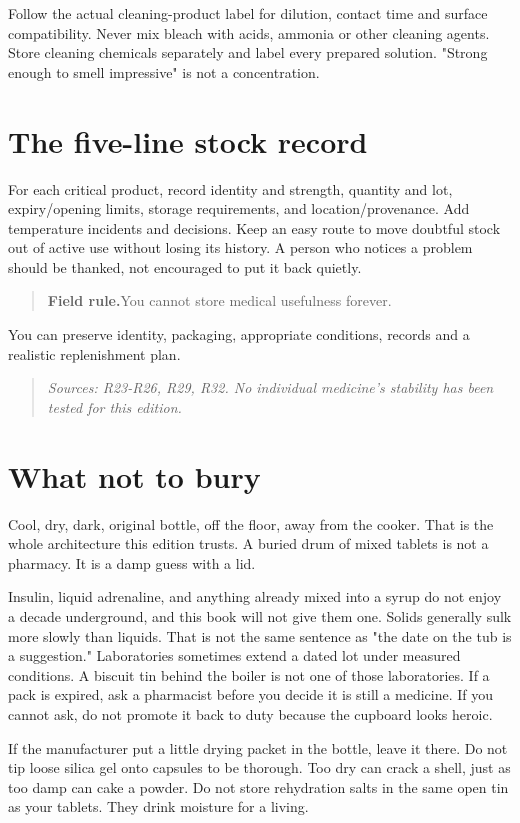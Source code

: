 \documentclass[10pt,openright]{book}
\newcommand{\fieldrule}[1]{\begin{quote}\textbf{Field rule.}\enspace #1\end{quote}}
\begin{document}
Follow the actual cleaning-product label for dilution, contact time and surface compatibility. Never mix bleach with acids, ammonia or other cleaning agents. Store cleaning chemicals separately and label every prepared solution. "Strong enough to smell impressive" is not a concentration.

\section*{The five-line stock record}
For each critical product, record identity and strength, quantity and lot, expiry/opening limits, storage requirements, and location/provenance. Add temperature incidents and decisions. Keep an easy route to move doubtful stock out of active use without losing its history. A person who notices a problem should be thanked, not encouraged to put it back quietly.

\fieldrule{You cannot store medical usefulness forever.}
You can preserve identity, packaging, appropriate conditions, records and a realistic replenishment plan.

\begin{quote}\emph{Sources: R23-R26, R29, R32. No individual medicine's stability has been tested for this edition.}\end{quote}
\section*{What not to bury}
Cool, dry, dark, original bottle, off the floor, away from the cooker. That is the whole architecture this edition trusts. A buried drum of mixed tablets is not a pharmacy. It is a damp guess with a lid.

Insulin, liquid adrenaline, and anything already mixed into a syrup do not enjoy a decade underground, and this book will not give them one. Solids generally sulk more slowly than liquids. That is not the same sentence as "the date on the tub is a suggestion." Laboratories sometimes extend a dated lot under measured conditions. A biscuit tin behind the boiler is not one of those laboratories. If a pack is expired, ask a pharmacist before you decide it is still a medicine. If you cannot ask, do not promote it back to duty because the cupboard looks heroic.

If the manufacturer put a little drying packet in the bottle, leave it there. Do not tip loose silica gel onto capsules to be thorough. Too dry can crack a shell, just as too damp can cake a powder. Do not store rehydration salts in the same open tin as your tablets. They drink moisture for a living.
\end{document}
